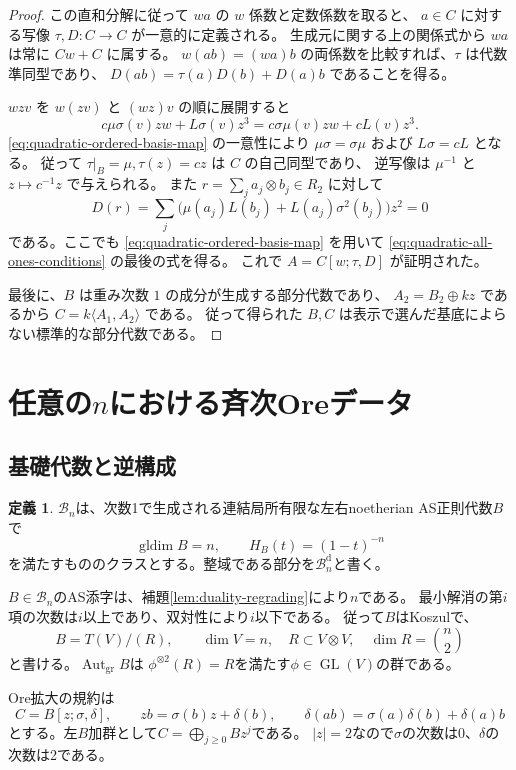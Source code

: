 \documentclass[11pt,a4paper]{ltjsarticle}
\theoremstyle{definition}
\newtheorem{definition}[theorem]{定義}
\newcommand{\Aut}{\operatorname{Aut}}
\newcommand{\GL}{\operatorname{GL}}
\newcommand{\gldim}{\operatorname{gldim}}
\newcommand{\Bclass}{\mathcal B}
\begin{document}
\begin{proof}
この直和分解に従って $wa$ の $w$ 係数と定数係数を取ると、
$a\in C$ に対する写像 $\tau,D:C\to C$ が一意的に定義される。
生成元に関する上の関係式から $wa$ は常に $Cw+C$ に属する。
$w(ab)=(wa)b$ の両係数を比較すれば、$\tau$ は代数準同型であり、
$D(ab)=\tau(a)D(b)+D(a)b$ であることを得る。

$wzv$ を $w(zv)$ と $(wz)v$ の順に展開すると
\[
 c\mu\sigma(v)zw+L\sigma(v)z^3
 =c\sigma\mu(v)zw+cL(v)z^3.
\]
\eqref{eq:quadratic-ordered-basis-map} の一意性により
$\mu\sigma=\sigma\mu$ および $L\sigma=cL$ となる。
従って $\tau|_B=\mu,\tau(z)=cz$ は $C$ の自己同型であり、
逆写像は $\mu^{-1}$ と $z\mapsto c^{-1}z$ で与えられる。
また $r=\sum_j a_j\otimes b_j\in R_2$ に対して
\[
 D(r)=\sum_j\bigl(\mu(a_j)L(b_j)+L(a_j)\sigma^2(b_j)\bigr)z^2=0
\]
である。ここでも \eqref{eq:quadratic-ordered-basis-map} を用いて
\eqref{eq:quadratic-all-ones-conditions} の最後の式を得る。
これで $A=C[w;\tau,D]$ が証明された。

最後に、$B$ は重み次数 $1$ の成分が生成する部分代数であり、
$A_2=B_2\oplus kz$ であるから
$C=k\langle A_1,A_2\rangle$ である。
従って得られた $B,C$ は表示で選んだ基底によらない標準的な部分代数である。

\end{proof}

\section{任意の$n$における斉次Oreデータ}\label{sec:general-ore-data}
\subsection{基礎代数と逆構成}
\begin{definition}\label{def:base-class}
$\Bclass_n$は、次数1で生成される連結局所有限な左右noetherian AS正則代数$B$で
\[
\gldim B=n,\qquad H_B(t)=(1-t)^{-n}
\]
を満たすもののクラスとする。整域である部分を$\Bclass_n^{\mathrm d}$と書く。
\end{definition}

$B\in\Bclass_n$のAS添字は、補題\ref{lem:duality-regrading}により$n$である。
最小解消の第$i$項の次数は$i$以上であり、双対性により$i$以下である。
従って$B$はKoszulで、
\[
B=T(V)/(R),\qquad \dim V=n,\quad
R\subset V\otimes V,\quad \dim R=\binom n2
\]
と書ける。$\Aut_{\mathrm{gr}}B$は
$\phi^{\otimes2}(R)=R$を満たす$\phi\in\GL(V)$の群である。

Ore拡大の規約は
\[
C=B[z;\sigma,\delta],\qquad
zb=\sigma(b)z+\delta(b),\qquad
\delta(ab)=\sigma(a)\delta(b)+\delta(a)b
\]
とする。左$B$加群として$C=\bigoplus_{j\geq0}Bz^j$である。
$|z|=2$なので$\sigma$の次数は0、$\delta$の次数は2である。
\end{document}
